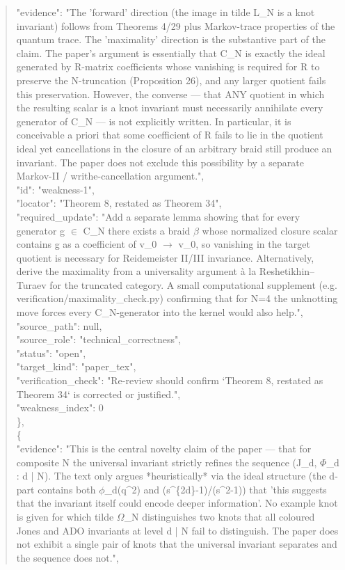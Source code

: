 \documentclass[11pt]{article}
\begin{document}
\begin{quote}
      "evidence": "The 'forward' direction (the image in tilde L\_N is a knot invariant) follows from Theorems 4/29 plus Markov-trace properties of the quantum trace. The 'maximality' direction is the substantive part of the claim. The paper's argument is essentially that C\_N is exactly the ideal generated by R-matrix coefficients whose vanishing is required for R to preserve the N-truncation (Proposition 26), and any larger quotient fails this preservation. However, the converse --- that ANY quotient in which the resulting scalar is a knot invariant must necessarily annihilate every generator of C\_N --- is not explicitly written. In particular, it is conceivable a priori that some coefficient of R fails to lie in the quotient ideal yet cancellations in the closure of an arbitrary braid still produce an invariant. The paper does not exclude this possibility by a separate Markov-II / writhe-cancellation argument.",\\
      "id": "weakness-1",\\
      "locator": "Theorem 8, restated as Theorem 34",\\
      "required\_update": "Add a separate lemma showing that for every generator g \ensuremath{\in} C\_N there exists a braid \ensuremath{\beta} whose normalized closure scalar contains g as a coefficient of v\_0 \ensuremath{\to} v\_0, so vanishing in the target quotient is necessary for Reidemeister II/III invariance. Alternatively, derive the maximality from a universality argument à la Reshetikhin--Turaev for the truncated category. A small computational supplement (e.g. verification/maximality\_check.py) confirming that for N=4 the unknotting move forces every C\_N-generator into the kernel would also help.",\\
      "source\_path": null,\\
      "source\_role": "technical\_correctness",\\
      "status": "open",\\
      "target\_kind": "paper\_tex",\\
      "verification\_check": "Re-review should confirm `Theorem 8, restated as Theorem 34` is corrected or justified.",\\
      "weakness\_index": 0\\
    \},\\
    \{\\
      "evidence": "This is the central novelty claim of the paper --- that for composite N the universal invariant strictly refines the sequence (J\_d, \ensuremath{\Phi}\_d : d | N). The text only argues *heuristically* via the ideal structure (the d-part contains both \ensuremath{\phi}\_d(q\^{}2) and (s\^{}\{2d\}-1)/(s\^{}2-1)) that 'this suggests that the invariant itself could encode deeper information'. No example knot is given for which tilde \ensuremath{\Omega}\_N distinguishes two knots that all coloured Jones and ADO invariants at level d | N fail to distinguish. The paper does not exhibit a single pair of knots that the universal invariant separates and the sequence does not.",\\

\end{quote}
\end{document}

